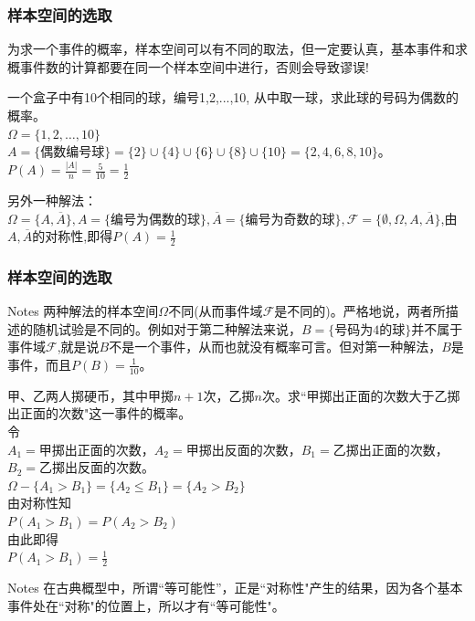 \begin{frame}
\frametitle{样本空间的选取}
为求一个事件的概率，样本空间可以有不同的取法，但一定要认真，基本事件和求概事件数的计算都要在同一个样本空间中进行，否则会导致谬误!
\begin{example}
	一个盒子中有10个相同的球，编号1,2,...,10, 从中取一球，求此球的号码为偶数的概率。\\
	$\Omega=\{1,2,\dots,10\}$\\
	$A=\{\text{偶数编号球} \}=\{2\}\cup\{4\}\cup\{6\}\cup\{8\}\cup\{10\}=\{2,4,6,8,10\}$。\\
	$P(A)=\frac{|A|}{n}=\frac{5}{10}=\frac{1}{2}$
\end{example}
另外一种解法：$\Omega=\{A,\overline{A}\},A=\{\text{编号为偶数的球}\},\overline{A}=\{\text{编号为奇数的球}\},\mathcal{F}=\{\emptyset,\Omega,A,\overline{A}\}$,由$A,\overline{A}$的对称性,即得$P(A)=\frac{1}{2}$

\end{frame}

\begin{frame}
\frametitle{样本空间的选取}
\begin{block}{Notes}
	两种解法的样本空间$\Omega$不同(从而事件域$\mathcal{F}$是不同的)。严格地说，两者所描述的随机试验是不同的。例如对于第二种解法来说，$B=\{\text{号码为4的球}\}$并不属于事件域$\mathcal{F}$,就是说$B$不是一个事件，从而也就没有概率可言。但对第一种解法，$B$是事件，而且$P(B)=\frac{1}{10}$。
\end{block}

\end{frame}

\begin{frame}
\begin{example}
	甲、乙两人掷硬币，其中甲掷$n+1$次，乙掷$n$次。求``甲掷出正面的次数大于乙掷出正面的次数"这一事件的概率。\\
	令\\ $A_1=$甲掷出正面的次数，$A_2=$甲掷出反面的次数，$B_1=$乙掷出正面的次数，$B_2=$乙掷出反面的次数。\\
	$\Omega-\{A_1 > B_1\}=\{A_2\le B_1\}=\{A_2>B_2\}$\\
	由对称性知\\
	$P(A_1>B_1)=P(A_2>B_2)$\\
	由此即得\\
	$P(A_1>B_1)=\frac{1}{2}$
\end{example}
\begin{block}{Notes}
	在古典概型中，所谓``等可能性''，正是``对称性"产生的结果，因为各个基本事件处在``对称"的位置上，所以才有``等可能性"。
\end{block}
\end{frame}

